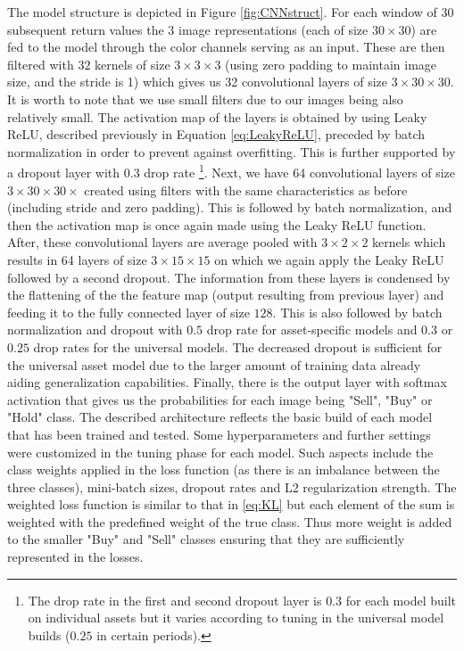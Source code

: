 \documentclass[11pt, a4paper]{article}
\begin{document}
The model structure is depicted in Figure \ref{fig:CNNstruct}. For each window of 30 subsequent return values the 3 image representations (each of size $30 \times 30$) are fed to the model through the color channels serving as an input. These are then filtered with $32$ kernels of size $3 \times 3 \times 3$ (using zero padding to maintain image size, and the stride is 1) which gives us 32 convolutional layers of size $3 \times 30 \times 30$. It is worth to note that we use small filters due to our images being also relatively small. The activation map of the layers is obtained by using Leaky ReLU, described previously in Equation \ref{eq:LeakyReLU}, preceded by batch normalization in order to prevent against overfitting. This is further supported by a dropout layer with $0.3$ drop rate \footnote{The drop rate in the first and second dropout layer is $0.3$ for each model built on individual assets but it varies according to tuning in the universal model builds ($0.25$ in certain periods).}. Next, we have 64 convolutional layers of size $3 \times 30 \times 30 \times$ created using filters with the same characteristics as before (including stride and zero padding). This is followed by batch normalization, and then the activation map is once again made using the Leaky ReLU function. After, these convolutional layers are average pooled with $3 \times 2 \times 2$ kernels which results in 64 layers of size $3 \times 15 \times 15$ on which we again apply the Leaky ReLU followed by a second dropout. The information from these layers is condensed by the flattening of the the feature map (output resulting from previous layer) and feeding it to the fully connected layer of size $128$. This is also followed by batch normalization and dropout with $0.5$ drop rate for asset-specific models and $0.3$ or $0.25$ drop rates for the universal models. The decreased dropout is sufficient for the universal asset model due to the larger amount of training data already aiding generalization capabilities. Finally, there is the output layer with softmax activation that gives us the probabilities for each image being "Sell", "Buy" or "Hold" class. The described architecture reflects the basic build of each model that has been trained and tested. Some hyperparameters and further settings were customized in the tuning phase for each model. Such aspects include the class weights applied in the loss function (as there is an imbalance between the three classes), mini-batch sizes, dropout rates and L2 regularization strength. The weighted loss function is similar to that in \ref{eq:KL} but each element of the sum is weighted with the predefined weight of the true class. Thus more weight is added to the smaller "Buy" and "Sell" classes ensuring that they are sufficiently represented in the losses.
\end{document}
